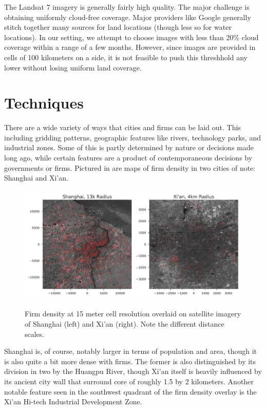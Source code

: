 \documentclass[12pt]{article}
\begin{document}
The Landsat 7 imagery is generally fairly high quality. The major challenge is obtaining uniformly cloud-free coverage. Major providers like Google generally stitch together many sources for land locations (though less so for water locations). In our setting, we attempt to choose images with less than 20\% cloud coverage within a range of a few months. However, since images are provided in cells of 100 kilometers on a side, it is not feasible to push this threshhold any lower without losing uniform land coverage.

\section{Techniques}

There are a wide variety of ways that cities and firms can be laid out. This including gridding patterns, geographic features like rivers, technology parks, and industrial zones. Some of this is partly determined by nature or decisions made long ago, while certain features are a product of contemporaneous decisions by governments or firms. Pictured in  are maps of firm density in two cities of note: Shanghai and Xi'an.

\begin{figure}
\begin{center}
\label{density_overlay}
\includegraphics[width=\textwidth]{density_overlay.pdf}

\caption{Firm density at 15 meter cell resolution overlaid on satellite imagery of Shanghai (left) and Xi'an (right). Note the different distance scales.}
\end{center}
\end{figure}

Shanghai is, of course, notably larger in terms of population and area, though it is also quite a bit more dense with firms. The former is also distinguished by its division in two by the Huangpu River, though Xi'an itself is heavily influenced by its ancient city wall that surround core of roughly 1.5 by 2 kilometers. Another notable feature seen in the southwest quadrant of the firm density overlay is the Xi'an Hi-tech Industrial Development Zone.
\end{document}
